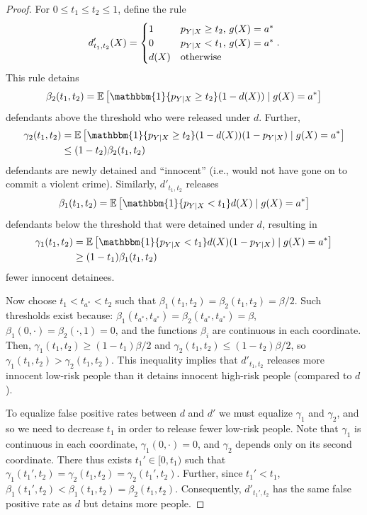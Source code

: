 \documentclass[sigconf]{acmart}
\newcommand{\EE}{\mathbb{E}}
\begin{document}
\begin{proof}
For $0 \leq t_1 \leq t_2 \leq 1$, define the rule
\begin{equation*}
d'_{t_1,t_2}(X) = \begin{cases}
1 & p_{Y|X}\geq t_2,\, g(X)=a^* \\
0 & p_{Y|X}< t_1,\, g(X)=a^* \\
d(X) & \textnormal{otherwise}
\end{cases}.
\end{equation*}
This rule detains
\begin{align*}
\beta_2(t_1,t_2)=\EE \left[\mathbbm{1}\{p_{Y|X}\geq t_2\}(1-d(X)) \mid g(X)=a^*\right]
\end{align*}
defendants above the threshold who were released under $d$. Further,
\begin{align*}
\gamma_2(t_1,t_2) &=\EE \left[ \mathbbm{1}\{p_{Y|X}\geq t_2\}(1-d(X))(1-p_{Y|X}) \mid g(X)=a^*\right]\\
&\leq(1-t_2)\beta_2(t_1,t_2)
\end{align*}
defendants are newly detained and ``innocent'' (i.e.,  would not have gone on to commit a violent crime). Similarly, $d'_{t_1,t_2}$ releases
\begin{align*}
\beta_1(t_1,t_2)=\EE \left[\mathbbm{1}\{p_{Y|X}< t_1\}d(X) \mid g(X)=a^*\right]
\end{align*}
defendants below the threshold that were detained under $d$, resulting in
\begin{align*}
\gamma_1(t_1,t_2) &=\EE \left[ \mathbbm{1}\{p_{Y|X}< t_1\}d(X)(1-p_{Y|X}) \mid g(X)=a^*\right]\\
&\geq(1-t_1)\beta_1(t_1,t_2)
\end{align*}
fewer innocent detainees.

Now choose $t_1< t_{a^*} < t_2$ such that $\beta_1(t_1, t_2)=\beta_2(t_1,t_2)=\beta/2.$
Such thresholds exist because: $\beta_1(t_{a^*},t_{a^*})=\beta_2(t_{a^*},t_{a^*})=\beta$, $\beta_1(0,\cdot) = \beta_2(\cdot,1) = 0$, 
and the functions $\beta_i$ are continuous in each coordinate. 
Then, $\gamma_1(t_1,t_2) \geq (1-t_1)\beta/2$ and $\gamma_2(t_1,t_2) \leq (1-t_2)\beta/2$, so $\gamma_1(t_1,t_2) > \gamma_2(t_1,t_2)$. 
This inequality implies that $d'_{t_1,t_2}$ releases more innocent low-risk people than it detains innocent high-risk people (compared to $d$). 

To equalize false positive rates between $d$ and $d'$ we must equalize $\gamma_1$ and $\gamma_2$, and so we need to decrease $t_1$ in order to release fewer low-risk people. 
Note that $\gamma_1$ is continuous in each coordinate, 
$\gamma_1(0, \cdot)=0$, and 
$\gamma_2$ depends only on its second coordinate.
There thus exists $t_1' \in [0,t_1)$ such that $\gamma_1(t_1',t_2) = \gamma_2(t_1, t_2) = \gamma_2(t_1',t_2)$.
Further, since $t_1' < t_1$,
$\beta_1(t_1',t_2) < \beta_1(t_1,t_2) = \beta_2(t_1,t_2)$.
Consequently, $d'_{t_1',t_2}$ has the same false positive rate as $d$ but detains more people.


\end{proof}
\end{document}
